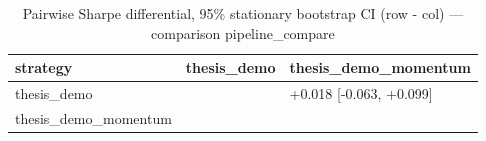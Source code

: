 \begin{table}
\caption{Pairwise Sharpe differential, 95\% stationary bootstrap CI (row - col) — comparison pipeline_compare}
\label{tab:pairwise_pipeline_compare}
\begin{tabular}{lll}
\toprule
strategy & thesis_demo & thesis_demo_momentum \\
\midrule
thesis_demo &  & +0.018 [-0.063, +0.099] \\
thesis_demo_momentum &  &  \\
\bottomrule
\end{tabular}
\end{table}
